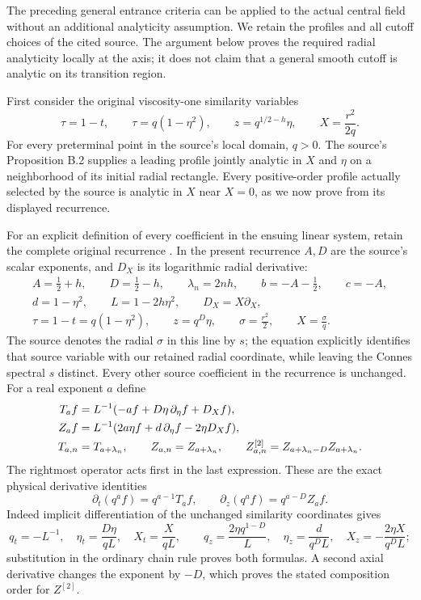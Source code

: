 The preceding general entrance criteria can be applied to the actual
central field without an additional analyticity assumption. We retain
the profiles and all cutoff choices of the cited source. The argument
below proves the required radial analyticity locally at the axis; it
does not claim that a general smooth cutoff is analytic on its
transition region.

First consider the original viscosity-one similarity variables
\[
 \tau=1-t,\qquad \tau=q(1-\eta^2),\qquad
 z=q^{1/2-h}\eta,\qquad X=\frac{r^2}{2q}.
\]
For every preterminal point in the source's local domain, $q>0$.
The source's Proposition B.2 supplies a leading profile jointly
analytic in $X$ and $\eta$ on a neighborhood of its initial radial
rectangle. Every positive-order profile actually selected by the
source is analytic in $X$ near $X=0$, as we now prove from its
displayed recurrence.

For an explicit definition of every coefficient in the ensuing
linear system, retain the complete original recurrence
\cite[equations (4.1)--(4.2), (5.1)--(5.6)]{cqNS2026}.
In the present recurrence $A,D$ are the source's scalar
exponents, and $D_X$ is its logarithmic radial derivative:
\begin{equation}
\begin{gathered}
 A=\tfrac12+h,\qquad D=\tfrac12-h,\qquad
 \lambda_n=2nh,\qquad b=-A-\tfrac12,\qquad c=-A,\\
 d=1-\eta^2,\qquad L=1-2h\eta^2,\qquad D_X=X\partial_X,\\
 \tau=1-t=q(1-\eta^2),\qquad z=q^D\eta,\qquad
 \sigma=\frac{r^2}{2},\qquad X=\frac{\sigma}{q}.
\end{gathered}
 \label{eq:cq-source-recurrence-parameters}
\end{equation}
The source denotes the radial $\sigma$ in this line by $s$;
the equation explicitly identifies that source variable with
our retained radial coordinate, while leaving the Connes
spectral $s$ distinct. Every other source coefficient in the
recurrence is unchanged. For a real exponent $a$ define
\begin{align}
 T_a f&=L^{-1}(-af+D\eta\,\partial_\eta f+D_Xf),\notag\\
 Z_a f&=L^{-1}(2a\eta f+d\,\partial_\eta f-2\eta D_Xf),\notag\\
 T_{a,n}&=T_{a+\lambda_n},\qquad
 Z_{a,n}=Z_{a+\lambda_n},\qquad
 Z^{[2]}_{a,n}=Z_{a+\lambda_n-D}Z_{a+\lambda_n}.
 \label{eq:cq-source-profile-time-axial-operators}
\end{align}
The rightmost operator acts first in the last expression.
These are the exact physical derivative identities
\[
 \partial_t(q^af)=q^{a-1}T_af,\qquad
 \partial_z(q^af)=q^{a-D}Z_af.
\]
Indeed implicit differentiation of the unchanged similarity
coordinates gives
\[
 q_t=-L^{-1},\quad \eta_t=\frac{D\eta}{qL},\quad
 X_t=\frac{X}{qL},\qquad
 q_z=\frac{2\eta q^{1-D}}L,\quad
 \eta_z=\frac{d}{q^DL},\quad
 X_z=-\frac{2\eta X}{q^DL};
\]
substitution in the ordinary chain rule proves both formulas.
A second axial derivative changes the exponent by $-D$,
which proves the stated composition order for $Z^{[2]}$.

